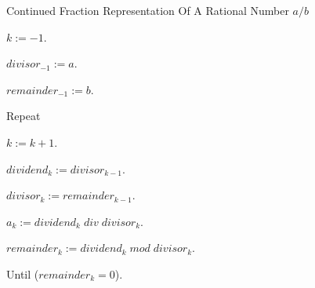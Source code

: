 \begin{vworkalgorithmstatementpar}{Continued Fraction Representation Of 
                                   A Rational Number \mbox{\boldmath $a/b$}}
\label{alg:ccfr0:scrn0:akgenalg}
\begin{alglvl0}
\item $k:=-1$.
\item $divisor_{-1} := a$.
\item $remainder_{-1} := b$.

\item Repeat

\begin{alglvl1}
\item $k := k + 1$.
\item $dividend_k := divisor_{k-1}$.
\item $divisor_k  := remainder_{k-1}$.
\item $a_k :=  dividend_k \; div \; divisor_k$.
\item $remainder_k := dividend_k \; mod \; divisor_k$.
\end{alglvl1}

\item Until ($remainder_k = 0$).
\end{alglvl0}
\end{vworkalgorithmstatementpar}

